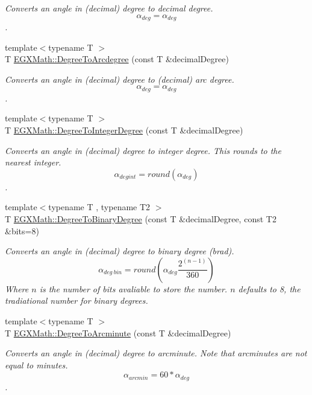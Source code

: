 \begin{DoxyCompactItemize}
\begin{DoxyCompactList}\small\item\em Converts an angle in (decimal) degree to decimal degree. \[\alpha_{deg}=\alpha_{deg}\]. \end{DoxyCompactList}\item 
{\footnotesize template$<$typename T $>$ }\\T \mbox{\hyperlink{group___e_g_x_math-_conversions-_angle_conversions-_degree_gac1b5f3b68f66c77a6df4ceef842c9b19}{E\+G\+X\+Math\+::\+Degree\+To\+Arcdegree}} (const T \&decimal\+Degree)
\begin{DoxyCompactList}\small\item\em Converts an angle in (decimal) degree to (decimal) arc degree. \[\alpha_{deg}=\alpha_{deg}\]. \end{DoxyCompactList}\item 
{\footnotesize template$<$typename T $>$ }\\T \mbox{\hyperlink{group___e_g_x_math-_conversions-_angle_conversions-_degree_gaabd20f21be3c18ee423d0bc1a677c6f6}{E\+G\+X\+Math\+::\+Degree\+To\+Integer\+Degree}} (const T \&decimal\+Degree)
\begin{DoxyCompactList}\small\item\em Converts an angle in (decimal) degree to integer degree. This rounds to the nearest integer. \[\alpha_{deg int}=round(\alpha_{deg})\]. \end{DoxyCompactList}\item 
{\footnotesize template$<$typename T , typename T2 $>$ }\\T \mbox{\hyperlink{group___e_g_x_math-_conversions-_angle_conversions-_degree_gacd1e3dc5194e89426a899a7cac4874f8}{E\+G\+X\+Math\+::\+Degree\+To\+Binary\+Degree}} (const T \&decimal\+Degree, const T2 \&bits=8)
\begin{DoxyCompactList}\small\item\em Converts an angle in (decimal) degree to binary degree (brad). \[\alpha_{deg\ bin}=round(\alpha_{deg}\frac{2^{(n-1)}}{360})\] Where $n$ is the number of bits avaliable to store the number. $n$ defaults to 8, the tradiational number for binary degrees. \end{DoxyCompactList}\item 
{\footnotesize template$<$typename T $>$ }\\T \mbox{\hyperlink{group___e_g_x_math-_conversions-_angle_conversions-_degree_ga8abf327dc5f52907b2c881999e9cc43e}{E\+G\+X\+Math\+::\+Degree\+To\+Arcminute}} (const T \&decimal\+Degree)
\begin{DoxyCompactList}\small\item\em Converts an angle in (decimal) degree to arcminute. Note that arcminutes are not equal to minutes. \[\alpha_{arcmin}= 60 * \alpha_{deg}\]. \end{DoxyCompactList}\item 

\end{DoxyCompactItemize}
